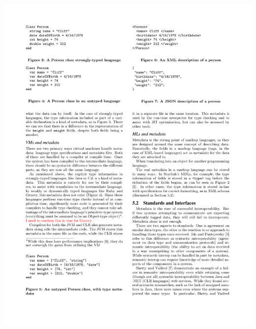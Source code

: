 \documentclass{beamer}
\begin{document}
\begin{frame}
\begin{columns}
\begin{column}{0.55\textwidth}
   \includegraphics[scale=1]{graphics/JSONCliff.pdf}
  \end{column}
  \end{columns}
  
\end{frame}
\end{document}
